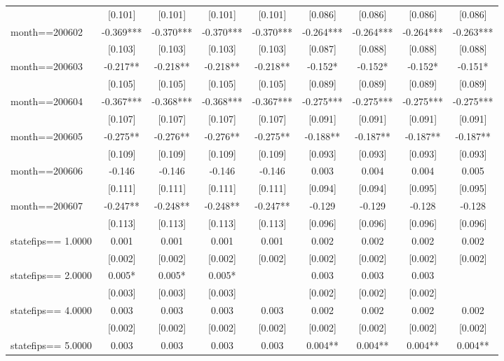 \documentclass[]{article}
\begin{document}
\begin{tabular}{lcccccccc}
 & [0.101] & [0.101] & [0.101] & [0.101] & [0.086] & [0.086] & [0.086] & [0.086] \\
month==200602 & -0.369*** & -0.370*** & -0.370*** & -0.370*** & -0.264*** & -0.264*** & -0.264*** & -0.263*** \\
 & [0.103] & [0.103] & [0.103] & [0.103] & [0.087] & [0.088] & [0.088] & [0.088] \\
month==200603 & -0.217** & -0.218** & -0.218** & -0.218** & -0.152* & -0.152* & -0.152* & -0.151* \\
 & [0.105] & [0.105] & [0.105] & [0.105] & [0.089] & [0.089] & [0.089] & [0.089] \\
month==200604 & -0.367*** & -0.368*** & -0.368*** & -0.367*** & -0.275*** & -0.275*** & -0.275*** & -0.275*** \\
 & [0.107] & [0.107] & [0.107] & [0.107] & [0.091] & [0.091] & [0.091] & [0.091] \\
month==200605 & -0.275** & -0.276** & -0.276** & -0.275** & -0.188** & -0.187** & -0.187** & -0.187** \\
 & [0.109] & [0.109] & [0.109] & [0.109] & [0.093] & [0.093] & [0.093] & [0.093] \\
month==200606 & -0.146 & -0.146 & -0.146 & -0.146 & 0.003 & 0.004 & 0.004 & 0.005 \\
 & [0.111] & [0.111] & [0.111] & [0.111] & [0.094] & [0.094] & [0.095] & [0.095] \\
month==200607 & -0.247** & -0.248** & -0.248** & -0.247** & -0.129 & -0.129 & -0.128 & -0.128 \\
 & [0.113] & [0.113] & [0.113] & [0.113] & [0.096] & [0.096] & [0.096] & [0.096] \\
statefips==     1.0000 & 0.001 & 0.001 & 0.001 & 0.001 & 0.002 & 0.002 & 0.002 & 0.002 \\
 & [0.002] & [0.002] & [0.002] & [0.002] & [0.002] & [0.002] & [0.002] & [0.002] \\
statefips==     2.0000 & 0.005* & 0.005* & 0.005* &  & 0.003 & 0.003 & 0.003 &  \\
 & [0.003] & [0.003] & [0.003] &  & [0.002] & [0.002] & [0.002] &  \\
statefips==     4.0000 & 0.003 & 0.003 & 0.003 & 0.003 & 0.002 & 0.002 & 0.002 & 0.002 \\
 & [0.002] & [0.002] & [0.002] & [0.002] & [0.002] & [0.002] & [0.002] & [0.002] \\
statefips==     5.0000 & 0.003 & 0.003 & 0.003 & 0.003 & 0.004** & 0.004** & 0.004** & 0.004** \\

\end{tabular}
\end{document}

